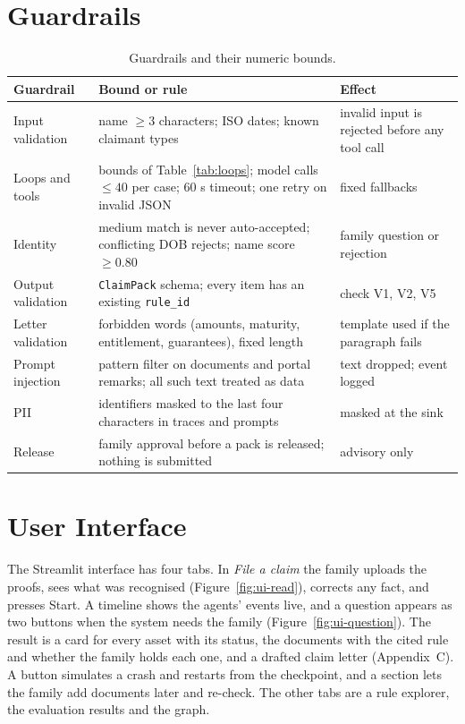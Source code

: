 \section{Guardrails}\label{sec:guard}
\begin{table}[H]
\centering\footnotesize{}
\caption{Guardrails and their numeric bounds.}\label{tab:guard}
\renewcommand{\arraystretch}{1.1}
\begin{tabularx}{\linewidth}{@{}p{3.3cm}p{3.5cm}X@{}}
\toprule
\textbf{Guardrail} & \textbf{Bound or rule} & \textbf{Effect} \\ \midrule
Input validation & name $\ge 3$ characters; ISO dates; known claimant types & invalid input is rejected before any tool call \\
Loops and tools & bounds of Table~\ref{tab:loops}; model calls $\le 40$ per case; 60 s timeout; one retry on invalid JSON & fixed fallbacks \\
Identity & medium match is never auto-accepted; conflicting DOB rejects; name score $\ge 0.80$ & family question or rejection \\
Output validation & \texttt{ClaimPack} schema; every item has an existing \texttt{rule\_id} & check V1, V2, V5 \\
Letter validation & forbidden words (amounts, maturity, entitlement, guarantees), fixed length & template used if the paragraph fails \\
Prompt injection & pattern filter on documents and portal remarks; all such text treated as data & text dropped; event logged \\
PII & identifiers masked to the last four characters in traces and prompts & masked at the sink \\
Release & family approval before a pack is released; nothing is submitted & advisory only \\ \bottomrule
\end{tabularx}
\end{table}

\section{User Interface}\label{sec:ui}
The Streamlit interface has four tabs. In \emph{File a claim} the family uploads the proofs, sees what was recognised (Figure~\ref{fig:ui-read}), corrects any fact, and presses Start. A timeline shows the agents' events live, and a question appears as two buttons when the system needs the family (Figure~\ref{fig:ui-question}). The result is a card for every asset with its status, the documents with the cited rule and whether the family holds each one, and a drafted claim letter (Appendix~C). A button simulates a crash and restarts from the checkpoint, and a section lets the family add documents later and re-check. The other tabs are a rule explorer, the evaluation results and the graph.

